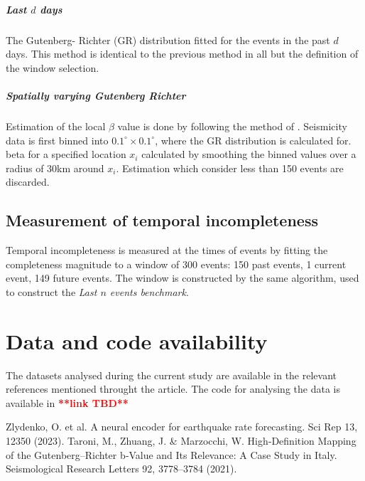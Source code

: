 \documentclass[pdflatex]{sn-jnl}
\begin{document}
\subparagraph{Last $d$ days} The Gutenberg- Richter (GR) distribution fitted for the events in the past $d$ days. This method is identical to the previous method in all but the definition of the window selection.


\subparagraph{Spatially varying Gutenberg Richter} Estimation of the local $\beta$ value is done by following the method of \cite{taroni_highdefinition_2021}. Seismicity data is first binned into $0.1^\circ \times 0.1^\circ$, where the GR distribution is calculated for. beta for a specified location $x_i$ calculated by smoothing the binned values over a radius of 30km around $x_i$. Estimation which consider less than 150 events are discarded.

\subsection{Measurement of temporal incompleteness}
Temporal incompleteness is measured at the times of events by fitting the completeness magnitude to a window of 300 events: 150 past events, 1 current event, 149 future events. The window is constructed by the same algorithm, used to construct the \textit{Last $n$ events benchmark}.




\section*{Data and code availability}
The datasets analysed during the current study are available in the relevant references mentioned throught the article.
The code for analysing the data is available in \textcolor{red}{\textbf{**link TBD**}}

\newpage
\renewcommand\refname{Methods References}
\begin{thebibliography}{10}
Zlydenko, O. et al. A neural encoder for earthquake rate forecasting. Sci Rep 13, 12350 (2023).
Taroni, M., Zhuang, J. \& Marzocchi, W. High‐Definition Mapping of the Gutenberg–Richter b‐Value and Its Relevance: A Case Study in Italy. Seismological Research Letters 92, 3778–3784 (2021).
  





\end{thebibliography}
\end{document}
